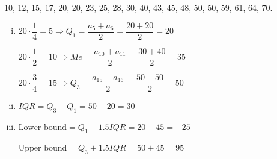 \documentclass[a4paper, 12pt]{article}  %
\begin{document}
10, 12, 15, 17, 20, 20, 23, 25, 28, 30,
40, 43, 45, 48, 50, 50, 59, 61, 64, 70.
    \begin{enumerate}[i.]
        \item 
        $20\cdot \dfrac{1}{4}=5\Rightarrow Q_1=\dfrac{a_5+a_6}{2}=\dfrac{20+20}{2}=20$
        
        $20\cdot \dfrac{1}{2}=10\Rightarrow Me=\dfrac{a_10+a_11}{2}=\dfrac{30+40}{2}=35$

         $20\cdot \dfrac{3}{4}=15\Rightarrow Q_3=\dfrac{a_15+a_16}{2}=\dfrac{50+50}{2}=50$
        \item $IQR=Q_3-Q_1=50-20=30$
        \item
        $\text{Lower bound} = Q_1-1.5IQR=20-45=-25$
        
        $\text{Upper bound} = Q_3+1.5IQR=50+45=95$

        \begin{figure}[htbp]
        \centering
        \end{figure}
    \end{enumerate}
\end{document}
